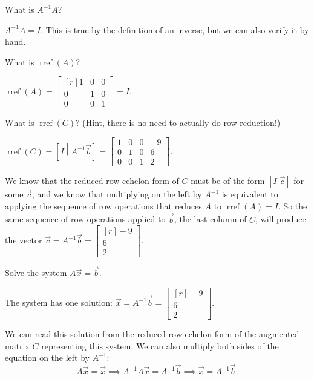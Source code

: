 \documentclass{problemset}
\DeclareMathOperator{\Rref}{rref}
\newcommand{\rref}{\Rref}
\newcommand{\mat}[1]{\begin{bmatrix*}[r]#1\end{bmatrix*}}
\begin{document}
	\begin{parts}
		\item What is $A^{-1}A$?
			\begin{solution}
				$A^{-1}A = I$. This is true by the definition of an inverse,
				but we can also verify it by hand.
			\end{solution}
		\item What is $\rref(A)$?
			\begin{solution}
				$\rref(A) = \mat{1&0&0\\0&1&0\\0&0&1} = I$.
			\end{solution}
		\item What is $\rref(C)$? (Hint, there is no need to actually do row reduction!)
			\begin{solution}
				$\rref(C) = \left[I\middle|A^{-1}\vec b\right]
				=\left[
					\begin{array}{rrr|r}
						1&0&0&-9\\
						0&1&0&6\\
						0&0&1&2
					\end{array}
				\right]$.

				We know that the reduced row echelon form of $C$ must be of the
				form $[I|\vec c]$ for some $\vec c$, and we know that multiplying
				on the left by $A^{-1}$ is equivalent to applying the sequence of
				row operations that reduces $A$ to $\rref(A)=I$. So the same sequence
				of row operations applied to $\vec b$, the last column of $C$,
				will produce the vector $\vec c=A^{-1}\vec b=\mat{-9\\6\\2}$.
			\end{solution}

		\item Solve the system $A\vec x=\vec b$.
			\begin{solution}
				The system has one solution: $\vec x=A^{-1}\vec b=\mat{-9\\6\\2}$.

				We can read this solution from the reduced row echelon form of the
				augmented matrix $C$ representing this system. We can also multiply
				both sides of the equation on the left by $A^{-1}$:
				\[
					A\vec x=\vec x
					\implies A^{-1}A\vec x=A^{-1}\vec b
					\implies \vec x=A^{-1}\vec b.
				\]
			\end{solution}
	\end{parts}
\end{document}
